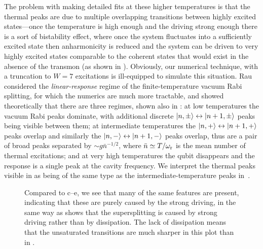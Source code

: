 The problem with making detailed fits at these higher temperatures is that the thermal peaks are due to multiple overlapping transitions between highly excited states---once the temperature is high enough and the driving strong enough there is a sort of bistability effect, where once the system fluctuates into a sufficiently excited state then anharmonicity is reduced and the system can be driven to very highly excited states comparable to the coherent states that would exist in the absence of the transmon (as shown in ). Obviously, our numerical technique, with a truncation to $W=7$ excitations is ill-equipped to simulate this situation. Rau \etal~\cite{rau_cavity_2004} considered the \emph{linear-response} regime of the finite-temperature vacuum Rabi splitting, for which the numerics are much more tractable, and showed theoretically that there are three regimes, shown also in : at low temperatures the vacuum Rabi peaks dominate, with additional discrete $\left\lvert n,\pm \right\rangle\leftrightarrow\left\lvert n+1,\pm \right\rangle$ peaks being visible between them; at intermediate temperatures the $\left\lvert n,+ \right\rangle\leftrightarrow\left\lvert n+1,+ \right\rangle$ peaks overlap and similarly the $\left\lvert n,- \right\rangle\leftrightarrow\left\lvert n+1,- \right\rangle$ peaks overlap, thus are a pair of broad peaks separated by $\sim g \bar{n}^{-1/2}$, where $\bar{n}\simeq T/\omega_{\text{r}}$ is the mean number of thermal excitations; and at very high temperatures the qubit disappears and the response is a single peak at the cavity frequency. We interpret the thermal peaks visible in  as being of the same type as the intermediate-temperature peaks in~\cite{rau_cavity_2004}.

\begin{figure}
 \centering
 \caption[Strong driving of $\sqrt{n}$ peaks in the limit of low dissipation]
 {\label{fig:nodissip} Compared to c--e, we see that many of the same features are present, indicating that these are purely caused by the strong driving, in the same way as  shows that the supersplitting is caused by strong driving rather than by dissipation. The lack of dissipation means that the unsaturated transitions are much sharper in this plot than in .}
 \end{figure}%
